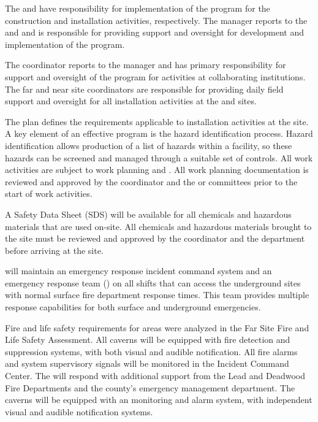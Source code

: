 The  and  have responsibility for
implementation of the   program for the construction and installation activities, respectively.  The
  manager reports to the
 and  and is responsible for providing
 support and oversight for development and implementation of the 
  program. 

The   coordinator reports to the
  manager and has primary responsibility
for  support and oversight of the  
program for activities at collaborating institutions.  The far and near site
 coordinators are responsible for providing daily field support and
oversight for all installation activities at the 
and  sites.

The   plan defines the 
requirements applicable to installation activities at the 
site. A key element of an effective  program is the hazard
identification process. Hazard identification allows production of a
list of hazards within a facility, so these hazards can be screened
and managed through a suitable set of controls. All work activities
are subject to work planning and .  
All work planning documentation is reviewed and
approved by the   coordinator and the 
 or  committees prior to the start of work activities.

A Safety Data Sheet (SDS) will be available for all chemicals and
hazardous materials that are used on-site. All chemicals and hazardous
materials brought to the  site must be reviewed and approved by the
  coordinator and the  
department before arriving at the site.

 will maintain an emergency response incident command
system and an emergency response team () on all shifts that can access the
underground sites with normal surface fire department response
times. This team provides multiple response capabilities for both
surface and underground emergencies.

Fire and life safety requirements for  areas were
analyzed in the  Far Site Fire and Life Safety
  Assessment. All caverns will be equipped with
fire detection and suppression systems, with both visual and audible
notification.  All fire alarms and system supervisory signals will be
monitored in the  Incident Command Center.  The
  will respond with additional support from the
Lead and Deadwood Fire Departments and the county's emergency management
department. The caverns will be equipped with
an  monitoring and alarm system, with independent visual and
audible notification systems.

